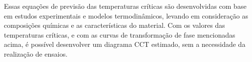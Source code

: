 \par
Essas equações de previsão das temperaturas críticas são desenvolvidas com base em estudos experimentais e modelos termodinâmicos, levando em consideração as composições químicas e as características do material. Com os valores das temperaturas críticas, e com as curvas de transformação de fase mencionadas acima, é possível desenvolver um diagrama CCT estimado, sem a necessidade da realização de ensaios.
